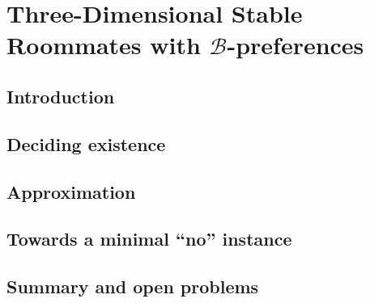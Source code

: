 \chapter{Three-Dimensional Stable Roommates with \texorpdfstring{$\mathscr{B}$}{B}-preferences}
\label{c:threed_sr_b}

\section{Introduction}
\label{sec:threed_sr_b_intro}


\section{Deciding existence}
\label{sec:threed_sr_b_hardness}


\section{Approximation}
\label{sec:threed_sr_b_approximation}


\section{Towards a minimal ``no'' instance}
\label{sec:threed_sr_b_structural}


\section{Summary and open problems}
\label{sec:threed_sr_b_conclusion}

